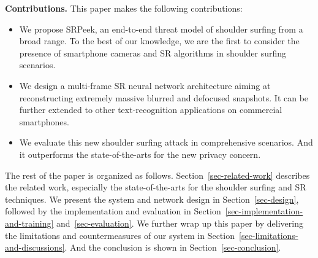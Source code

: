 \vspace{1mm}
\noindent
\textbf{Contributions.} This paper makes the following contributions:
\begin{itemize}[leftmargin=*]
  \item	We propose \textsf{SRPeek}, an end-to-end threat model of shoulder surfing from a broad range. To the best of our knowledge, we are the first to consider the presence of smartphone cameras and SR algorithms in shoulder surfing scenarios.
  \item	We design a multi-frame SR neural network architecture aiming at reconstructing extremely massive blurred and defocused snapshots. It can be further extended to other text-recognition applications on commercial smartphones.
  \item	We evaluate this new shoulder surfing attack in comprehensive scenarios. And it outperforms the state-of-the-arts for the new privacy concern.
\end{itemize}
The rest of the paper is organized as follows. Section~\ref{sec-related-work} describes the related work, especially the state-of-the-arts for the shoulder surfing and SR techniques. We present the system and network design in Section~\ref{sec-design}, followed by the implementation and evaluation in Section~\ref{sec-implementation-and-training} and~\ref{sec-evaluation}. We further wrap up this paper by delivering the limitations and countermeasures of our system in Section~\ref{sec-limitations-and-discussions}. And the conclusion is shown in Section~\ref{sec-conclusion}.
